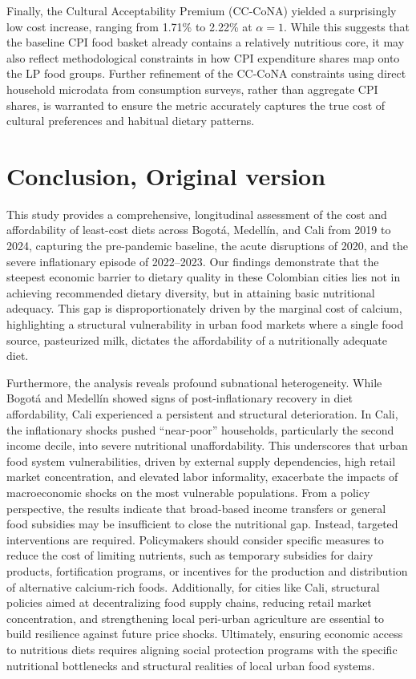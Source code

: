 \documentclass[Afour, sageh,times]{sagej}
\begin{document}
Finally, the Cultural Acceptability Premium (CC-CoNA) yielded a surprisingly low cost increase, ranging from 1.71\% to 2.22\% at $\alpha=1$. While this suggests that the baseline CPI food basket already contains a relatively nutritious core, it may also reflect methodological constraints in how CPI expenditure shares map onto the LP food groups. Further refinement of the CC-CoNA constraints using direct household microdata from consumption surveys, rather than aggregate CPI shares, is warranted to ensure the metric accurately captures the true cost of cultural preferences and habitual dietary patterns.

\section*{Conclusion, Original version}

This study provides a comprehensive, longitudinal assessment of the cost and affordability of least-cost diets across Bogotá, Medellín, and Cali from 2019 to 2024, capturing the pre-pandemic baseline, the acute disruptions of 2020, and the severe inflationary episode of 2022--2023. Our findings demonstrate that the steepest economic barrier to dietary quality in these Colombian cities lies not in achieving recommended dietary diversity, but in attaining basic nutritional adequacy. This gap is disproportionately driven by the marginal cost of calcium, highlighting a structural vulnerability in urban food markets where a single food source, pasteurized milk, dictates the affordability of a nutritionally adequate diet.

Furthermore, the analysis reveals profound subnational heterogeneity. While Bogotá and Medellín showed signs of post-inflationary recovery in diet affordability, Cali experienced a persistent and structural deterioration. In Cali, the inflationary shocks pushed ``near-poor'' households, particularly the second income decile, into severe nutritional unaffordability. This underscores that urban food system vulnerabilities, driven by external supply dependencies, high retail market concentration, and elevated labor informality, exacerbate the impacts of macroeconomic shocks on the most vulnerable populations. From a policy perspective, the results indicate that broad-based income transfers or general food subsidies may be insufficient to close the nutritional gap. Instead, targeted interventions are required. Policymakers should consider specific measures to reduce the cost of limiting nutrients, such as temporary subsidies for dairy products, fortification programs, or incentives for the production and distribution of alternative calcium-rich foods. Additionally, for cities like Cali, structural policies aimed at decentralizing food supply chains, reducing retail market concentration, and strengthening local peri-urban agriculture are essential to build resilience against future price shocks. Ultimately, ensuring economic access to nutritious diets requires aligning social protection programs with the specific nutritional bottlenecks and structural realities of local urban food systems.
\end{document}

